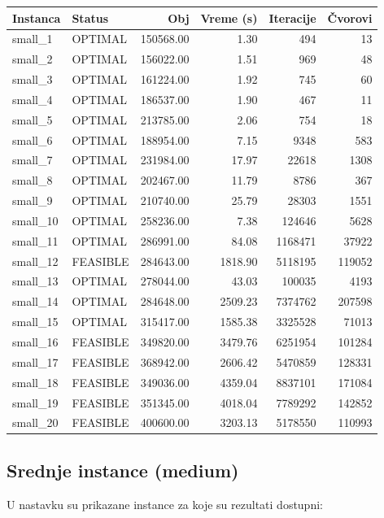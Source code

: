 \documentclass[12pt,a4paper]{article}
\begin{document}
\begin{longtable}{l l r r r r}
\toprule
\textbf{Instanca} & \textbf{Status} & \textbf{Obj} & \textbf{Vreme (s)} & \textbf{Iteracije} & \textbf{Čvorovi} \\
\midrule
\endhead

small\_1  & OPTIMAL  & 150568.00 & 1.30   & 494      & 13 \\
small\_2  & OPTIMAL  & 156022.00 & 1.51   & 969      & 48 \\
small\_3  & OPTIMAL  & 161224.00 & 1.92   & 745      & 60 \\
small\_4  & OPTIMAL  & 186537.00 & 1.90   & 467      & 11 \\
small\_5  & OPTIMAL  & 213785.00 & 2.06   & 754      & 18 \\
small\_6  & OPTIMAL  & 188954.00 & 7.15   & 9348     & 583 \\
small\_7  & OPTIMAL  & 231984.00 & 17.97  & 22618    & 1308 \\
small\_8  & OPTIMAL  & 202467.00 & 11.79  & 8786     & 367 \\
small\_9  & OPTIMAL  & 210740.00 & 25.79  & 28303    & 1551 \\
small\_10 & OPTIMAL  & 258236.00 & 7.38   & 124646   & 5628 \\
small\_11 & OPTIMAL  & 286991.00 & 84.08  & 1168471  & 37922 \\
small\_12 & FEASIBLE & 284643.00 & 1818.90& 5118195  & 119052 \\
small\_13 & OPTIMAL  & 278044.00 & 43.03  & 100035   & 4193 \\
small\_14 & OPTIMAL  & 284648.00 & 2509.23& 7374762  & 207598 \\
small\_15 & OPTIMAL  & 315417.00 & 1585.38& 3325528  & 71013 \\
small\_16 & FEASIBLE & 349820.00 & 3479.76& 6251954  & 101284 \\
small\_17 & FEASIBLE & 368942.00 & 2606.42& 5470859  & 128331 \\
small\_18 & FEASIBLE & 349036.00 & 4359.04& 8837101  & 171084 \\
small\_19 & FEASIBLE & 351345.00 & 4018.04& 7789292  & 142852 \\
small\_20 & FEASIBLE & 400600.00 & 3203.13& 5178550  & 110993 \\
\bottomrule
\end{longtable}

\subsection{Srednje instance (medium)}
U nastavku su prikazane instance za koje su rezultati dostupni:
\end{document}
